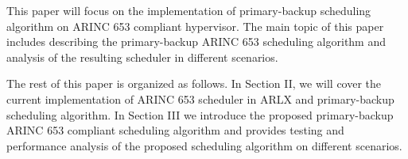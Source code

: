 \documentclass[conference]{IEEEtran}
\begin{document}
This paper will focus on the implementation of primary-backup scheduling algorithm on ARINC 653
compliant hypervisor. The main topic of this paper includes describing the primary-backup ARINC
653 scheduling algorithm and analysis of the resulting scheduler in different scenarios.

The rest of this paper is organized as follows. In Section II, we will cover the current
implementation of ARINC 653 scheduler in ARLX and primary-backup scheduling algorithm. In
Section III we introduce the proposed primary-backup ARINC 653 compliant scheduling algorithm
and provides testing and performance analysis of the proposed scheduling algorithm on different
scenarios.





%
%

\end{document}
